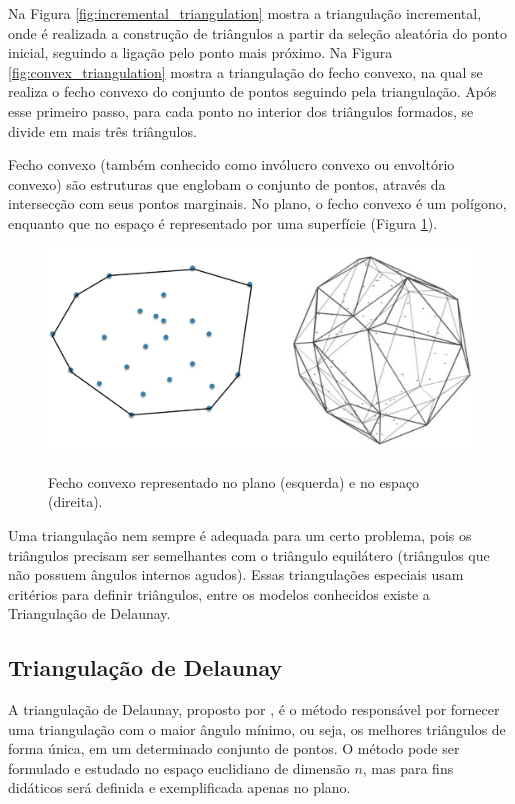Na Figura \ref{fig:incremental_triangulation} mostra a triangulação incremental, onde é realizada a construção de triângulos a partir da seleção aleatória do ponto inicial, seguindo a ligação pelo ponto mais próximo. 
Na Figura \ref{fig:convex_triangulation} mostra a triangulação do fecho convexo, na qual se realiza o fecho convexo do conjunto de pontos seguindo pela triangulação.
Após esse primeiro passo, para cada ponto no interior dos triângulos formados, se divide em mais três triângulos.

Fecho convexo (também conhecido como invólucro convexo ou envoltório convexo) são estruturas que englobam o conjunto de pontos, através da intersecção com seus pontos marginais. No plano, o fecho convexo é um polígono, enquanto que no espaço é representado por uma superfície (Figura \ref{fig:convex_hull}).

\begin{figure}[H]
    \centering
    \caption{Fecho convexo representado no plano (esquerda) e no espaço (direita).}
    \includegraphics[scale=0.4]{dados/figuras/convex_hull.png}
    \label{fig:convex_hull}
\end{figure}

Uma triangulação nem sempre é adequada para um certo problema, pois os triângulos precisam ser semelhantes com o triângulo equilátero (triângulos que não possuem ângulos internos agudos). Essas triangulações especiais usam critérios para definir triângulos, entre os modelos conhecidos existe a Triangulação de Delaunay.


\subsection{Triangulação de Delaunay}
\label{sec:delaunay}
A triangulação de Delaunay, proposto por \cite{delaunay1934sphere}, é o método responsável por fornecer uma triangulação com o maior ângulo mínimo, ou seja, os melhores triângulos de forma única, em um determinado conjunto de pontos. O método pode ser formulado e estudado no espaço euclidiano de dimensão $n$, mas para fins didáticos será definida e exemplificada apenas no plano.

